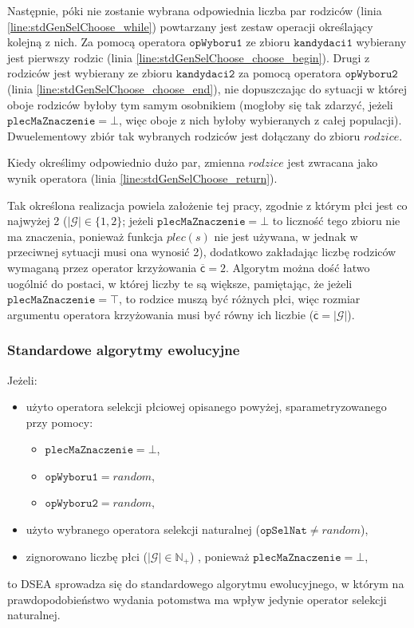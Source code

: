 \documentclass[twoside]{iisthesis}
\newcommand{\numberSet}[1]{\mathbb{#1}}
\newcommand{\important}[1]{\mathcal{#1}}
\newcommand{\param}[1]{\mathtt{#1}}
\newcommand{\variable}[1]{\mathsf{#1}}
\newcommand{\inputVar}[1]{\variable{\overline{#1}}}
\begin{document}
Następnie, póki nie zostanie wybrana odpowiednia liczba par rodziców (linia \ref{line:stdGenSelChoose_while}) powtarzany jest zestaw operacji określający kolejną z nich.
Za pomocą operatora $\param{opWyboru1}$ ze zbioru $\param{kandydaci1}$ wybierany jest pierwszy rodzic (linia \ref{line:stdGenSelChoose_choose_begin}).
Drugi z rodziców jest wybierany ze zbioru $\param{kandydaci2}$ za pomocą operatora $\param{opWyboru2}$  (linia \ref{line:stdGenSelChoose_choose_end}), nie dopuszczając do sytuacji w której oboje rodziców byłoby tym samym osobnikiem (mogłoby się tak zdarzyć, jeżeli $\param{plecMaZnaczenie} = \bot$, więc oboje z nich byłoby wybieranych z całej populacji).
Dwuelementowy zbiór tak wybranych rodziców jest dołączany do zbioru $rodzice$.

Kiedy określimy odpowiednio dużo par, zmienna $rodzice$ jest zwracana jako wynik operatora (linia \ref{line:stdGenSelChoose_return}).

Tak określona realizacja powiela założenie tej pracy, zgodnie z którym płci jest co najwyżej 2 ($|\important{G}| \in \{ 1, 2 \}$; jeżeli $\param{plecMaZnaczenie} = \bot$ to liczność tego zbioru nie ma znaczenia, ponieważ funkcja $plec(s)$ nie jest używana, w jednak w przeciwnej sytuacji musi ona wynosić 2), dodatkowo zakładając liczbę rodziców wymaganą przez operator krzyżowania $\inputVar{c}=2$.
Algorytm można dość łatwo uogólnić do postaci, w której liczby te są większe, pamiętając, że jeżeli $\param{plecMaZnaczenie} = \top$, to rodzice muszą być różnych płci, więc rozmiar argumentu operatora krzyżowania musi być równy ich liczbie ($\inputVar{c} = |\important{G}|$).

\subsubsection{Standardowe algorytmy ewolucyjne}

Jeżeli:
\begin{itemize}
	\item użyto operatora selekcji płciowej opisanego powyżej, sparametryzowanego przy pomocy:
	\begin{itemize}
		\item $\param{plecMaZnaczenie} = \bot$,
		\item $\param{opWyboru1} = random$,
		\item $\param{opWyboru2} = random$,
	\end{itemize}
	\item użyto wybranego operatora selekcji naturalnej ($\param{opSelNat} \neq random$),
	\item zignorowano liczbę płci ($|\important{G}| \in \numberSet{N}_{+}$) , ponieważ $\param{plecMaZnaczenie} = \bot$,
\end{itemize}
to DSEA sprowadza się do standardowego algorytmu ewolucyjnego, w którym na prawdopodobieństwo wydania potomstwa ma wpływ jedynie operator selekcji naturalnej.
\end{document}
